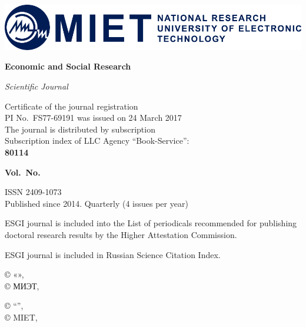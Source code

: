 \begin{center}
  \includegraphics[width=\textwidth]{logo-en}

  {\fontsize{16pt}{20pt}\selectfont\bfseries Economic and Social Research \par}

  {\itshape Scientific Journal}
\end{center}

\noindent
\begin{minipage}{.5\textwidth}
  \small
  Certificate of the journal registration\\
  PI No. FS77-69191 was issued on 24 March 2017\\
  The journal is distributed by subscription\\
  Subscription index of LLC Agency ``Book-Service'':\\
\textbf{80114}
\end{minipage}%
\begin{minipage}{.5\textwidth}
\begin{flushright}
  {\fontsize{16pt}{20pt}\selectfont\bfseries Vol.\, \esgiVol{} No.\, \esgiNum{}\\
  \esgiYear \par}

  \vspace{5mm}
  \small
  ISSN 2409-1073\\
  Published since 2014. Quarterly (4 issues per year)
\end{flushright}
\end{minipage}

\begin{flushleft}
  \small
  ESGI journal is included into the List of periodicals recommended for publishing doctoral research results by
  the Higher Attestation Commission.

  \vspace{5mm}
  ESGI journal is included in Russian Science Citation Index.
\end{flushleft}

\vfill

\noindent\hrulefill

\noindent
\begin{minipage}{.6\textwidth}
\begin{flushleft}
  \scriptsize
  © «\esgiName{}», \esgiYear\\
  © МИЭТ, \esgiYear
\end{flushleft}
\end{minipage}%
\begin{minipage}{.4\textwidth}
\begin{flushright}
  \scriptsize
  © ``\esgiNameEn{}'', \esgiYear\\
  © MIET, \esgiYear
\end{flushright}
\end{minipage}

\clearpage